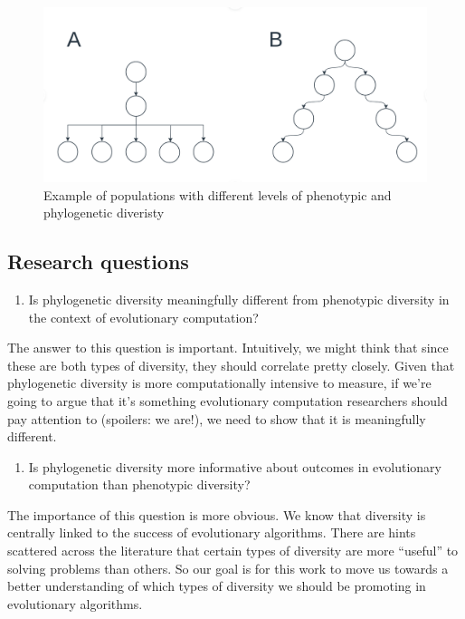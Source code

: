 \documentclass[]{book}
\providecommand{\tightlist}{%
  \setlength{\itemsep}{0pt}\setlength{\parskip}{0pt}}
\begin{document}
\begin{figure}
\centering
\includegraphics{conceptual_fig.png}
\caption{Example of populations with different levels of phenotypic and phylogenetic diveristy}
\end{figure}

\hypertarget{research-questions}{%
\subsection{Research questions}\label{research-questions}}

\begin{enumerate}
\def\labelenumi{\arabic{enumi}.}
\tightlist
\item
  Is phylogenetic diversity meaningfully different from phenotypic diversity in the context of evolutionary computation?
\end{enumerate}

The answer to this question is important. Intuitively, we might think that since these are both types of diversity, they should correlate pretty closely. Given that phylogenetic diversity is more computationally intensive to measure, if we're going to argue that it's something evolutionary computation researchers should pay attention to (spoilers: we are!), we need to show that it is meaningfully different.

\begin{enumerate}
\def\labelenumi{\arabic{enumi}.}
\setcounter{enumi}{1}
\tightlist
\item
  Is phylogenetic diversity more informative about outcomes in evolutionary computation than phenotypic diversity?
\end{enumerate}

The importance of this question is more obvious. We know that diversity is centrally linked to the success of evolutionary algorithms. There are hints scattered across the literature that certain types of diversity are more ``useful'' to solving problems than others. So our goal is for this work to move us towards a better understanding of which types of diversity we should be promoting in evolutionary algorithms.
\end{document}
